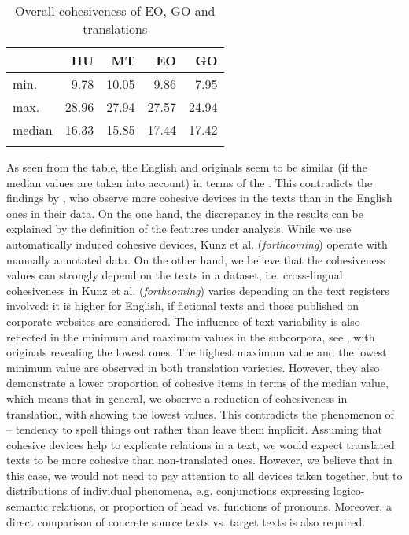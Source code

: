 \documentclass[output=paper]{langsci/langscibook.cls}
\begin{document}
\begin{table}

\begin{tabular}{lrrrr}
\lsptoprule
	&	\bf HU &\bf MT &\bf EO &\bf GO\\
\midrule
min.    &       9.78  & 10.05 & 9.86  & 7.95 \\
max.    &       28.96 & 27.94 & 27.57 & 24.94 \\
median	&	16.33&	15.85 & 17.44 &	17.42\\
\lspbottomrule
\end{tabular}
\caption{Overall cohesiveness of EO, GO and translations}
\label{table:cohesiveness}
\end{table}

As seen from the table, the English and  originals seem to be similar (if the median values are taken into account) in terms of the . This contradicts the findings by \citep[22]{SleGeccoForthcoming}, who observe more cohesive devices in the  texts than in the English ones in their data. 
On the one hand, the discrepancy in the results can be explained by the definition of the features under analysis. While we use automatically induced cohesive devices, Kunz et al. (\textsl{forthcoming}) operate with manually annotated data. On the other hand, we believe that the cohesiveness values can strongly depend on the texts in a dataset, i.e. cross-lingual cohesiveness in Kunz et al. (\textsl{forthcoming}) varies depending on the text registers involved: it is higher for English, if fictional texts and those published on corporate websites are considered. %
The influence of text variability is also reflected in the minimum and maximum values in the subcorpora, see , with  originals revealing the lowest ones. The highest maximum value and the lowest minimum value are observed in both translation varieties. However, they also demonstrate a lower proportion of cohesive items in terms of the median value, which means that in general, we observe a reduction of cohesiveness in translation, with  showing the lowest values. %
This contradicts the phenomenon of  -- tendency to spell things out rather than leave them implicit. Assuming that cohesive devices help to explicate  relations in a text, we would expect translated texts to be more cohesive than non-translated ones. However, we believe that in this case, we would not need to pay attention to all devices taken together, but to distributions of individual phenomena, e.g. conjunctions expressing logico-semantic relations, or proportion of head vs.  functions of pronouns. Moreover, a direct comparison of concrete source texts vs. target texts is also required.
\end{document}
